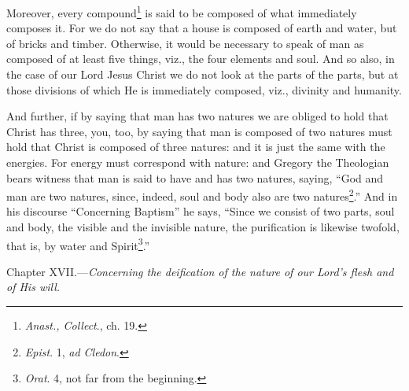 Moreover, every compound\footnote{\emph{Anast., Collect}., ch. 19.} is said to be composed of what immediately composes it. For we do not say that a house is composed of earth and water, but of bricks and timber. Otherwise, it would be necessary to speak of man as composed of at least five things, viz., the four elements and soul. And so also, in the case of our Lord Jesus Christ we do not look at the parts of the parts, but at those divisions of which He is immediately composed, viz., divinity and humanity.

And further, if by saying that man has two natures we are obliged to hold that Christ has three, you, too, by saying that man is composed of two natures must hold that Christ is composed of three natures: and it is just the same with the energies. For energy must correspond with nature: and Gregory the Theologian bears witness that man is said to have and has two natures, saying, “God and man are two natures, since, indeed, soul and body also are two natures\footnote{\emph{Epist}. 1, \emph{ad Cledon}.}.” And in his discourse “Concerning Baptism” he says, “Since we consist of two parts, soul and body, the visible and the invisible nature, the purification is likewise twofold, that is, by water and Spirit\footnote{\emph{Orat}. 4, not far from the beginning.}.”


Chapter XVII.—\emph{Concerning the deification of the nature of our Lord’s flesh and of His will.}

